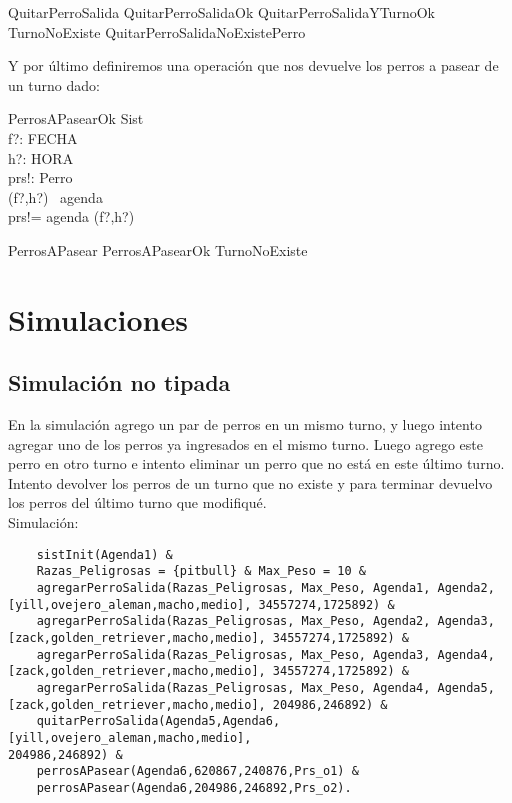 \documentclass[12pt,zed]{article}
\begin{document}
\begin{zed}
QuitarPerroSalida  QuitarPerroSalidaOk \lor QuitarPerroSalidaYTurnoOk \lor \\ TurnoNoExiste \lor QuitarPerroSalidaNoExistePerro
\end{zed}

Y por último definiremos una operación que nos devuelve los perros a pasear de un turno dado:

\begin{schema}{PerrosAPasearOk}
\Xi Sist \\
f?: FECHA \\
h?: HORA \\
prs!: \power Perro\\
\where
(f?,h?) \in \dom \ agenda \\

prs!= agenda (f?,h?) \\
\end{schema}

\begin{zed}
PerrosAPasear  PerrosAPasearOk \lor TurnoNoExiste
\end{zed}

\newpage

\section*{Simulaciones}
\subsection*{Simulación no tipada}

En la simulación agrego un par de perros en un mismo turno, y luego intento agregar uno de los perros ya ingresados en el mismo turno. Luego agrego este perro en otro turno e intento eliminar un perro que no está en este último turno. Intento devolver los perros de un turno que no existe y para terminar devuelvo los perros del último turno que modifiqué. \\

Simulación:

\begin{verbatim}
    sistInit(Agenda1) &
    Razas_Peligrosas = {pitbull} & Max_Peso = 10 &
    agregarPerroSalida(Razas_Peligrosas, Max_Peso, Agenda1, Agenda2,
[yill,ovejero_aleman,macho,medio], 34557274,1725892) &
    agregarPerroSalida(Razas_Peligrosas, Max_Peso, Agenda2, Agenda3,
[zack,golden_retriever,macho,medio], 34557274,1725892) &
    agregarPerroSalida(Razas_Peligrosas, Max_Peso, Agenda3, Agenda4,
[zack,golden_retriever,macho,medio], 34557274,1725892) &
    agregarPerroSalida(Razas_Peligrosas, Max_Peso, Agenda4, Agenda5,
[zack,golden_retriever,macho,medio], 204986,246892) &
    quitarPerroSalida(Agenda5,Agenda6,[yill,ovejero_aleman,macho,medio],
204986,246892) &
    perrosAPasear(Agenda6,620867,240876,Prs_o1) &
    perrosAPasear(Agenda6,204986,246892,Prs_o2).
\end{verbatim}
\end{document}
